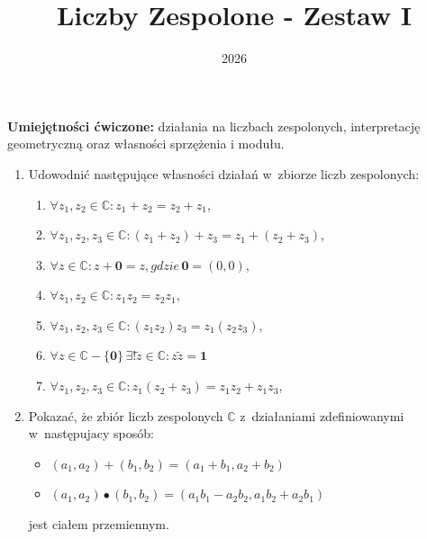 \documentclass{article}
\title{Liczby Zespolone - Zestaw I}
\date{2026}
\begin{document}
\maketitle

\begin{center}
\textbf{Umiejętności ćwiczone:} działania na liczbach zespolonych, interpretację geometryczną oraz własności sprzężenia i modułu.
\end{center}



\begin{enumerate}
    \item Udowodnić następujące własności działań w~zbiorze liczb zespolonych:
    \begin{enumerate}
        \item $ \forall z_{1}, z_{2} \in \mathbb{C}: z_{1} + z_{2} = z_{2} + z_{1} $,
        \item $ \forall z_{1}, z_{2}, z_{3} \in \mathbb{C}: \left( z_{1} + z_{2} \right) +z_{3} = z_{1} + \left( z_{2} + z_{3} \right) $,
        \item $ \forall z \in \mathbb{C}: z + \textbf{0} = z, gdzie\, \textbf{0} = (0, 0) $,
        \item $ \forall z_{1}, z_{2} \in \mathbb{C}: z_{1}z_{2} = z_{2}z_{1} $,
        \item $ \forall z_{1}, z_{2}, z_{3} \in \mathbb{C}: \left(z_{1}z_{2}\right)z_{3} = z_{1}\left(z_{2}z_{3}\right) $,
        \item $ \forall z \in \mathbb{C}-\{\textbf{0}\} \, \exists! \tilde{z} \in \mathbb{C}: z\tilde{z}=\textbf{1}  $%
        \item $ \forall z_{1}, z_{2}, z_{3} \in \mathbb{C}: z_{1} \left(z_{2} + z_{3}\right) = z_{1}z_{2} + z_{1}z_{3}$,
    \end{enumerate}
    
    \item Pokazać, że zbiór liczb zespolonych $\mathbb{C}$ z~działaniami zdefiniowanymi w~następujacy sposób:
    \begin{itemize}
        \item $ \left( a_{1}, a_{2} \right) + \left( b_{1}, b_{2} \right) = \left( a_{1} + b_{1}, a_{2} + b_{2} \right) $
        \item $ \left( a_{1}, a_{2} \right) \bullet \left( b_{1}, b_{2} \right) = \left( a_{1}b_{1} - a_{2}b_{2}, a_{1}b_{2} + a_{2}b_{1} \right) $
    \end{itemize}
    jest ciałem przemiennym.
    

\end{enumerate}
\end{document}
